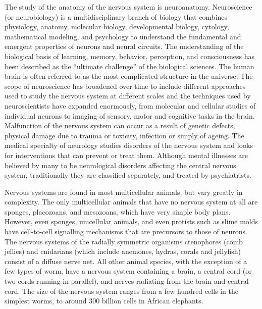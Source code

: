 \documentclass[]{book}
\begin{document}
The study of the anatomy of the nervous system is neuroanatomy. Neuroscience (or neurobiology) is a multidisciplinary branch of biology that combines physiology, anatomy, molecular biology, developmental biology, cytology, mathematical modeling, and psychology to understand the fundamental and emergent properties of neurons and neural circuits. The understanding of the biological basis of learning, memory, behavior, perception, and consciousness has been described as the ``ultimate challenge'' of the biological sciences. The human brain is often referred to as the most complicated structure in the universe. The scope of neuroscience has broadened over time to include different approaches used to study the nervous system at different scales and the techniques used by neuroscientists have expanded enormously, from molecular and cellular studies of individual neurons to imaging of sensory, motor and cognitive tasks in the brain. Malfunction of the nervous system can occur as a result of genetic defects, physical damage due to trauma or toxicity, infection or simply of ageing. The medical specialty of neurology studies disorders of the nervous system and looks for interventions that can prevent or treat them. Although mental illnesses are believed by many to be neurological disorders affecting the central nervous system, traditionally they are classified separately, and treated by psychiatrists.

Nervous systems are found in most multicellular animals, but vary greatly in complexity. The only multicellular animals that have no nervous system at all are sponges, placozoans, and mesozoans, which have very simple body plans. However, even sponges, unicellular animals, and even protists such as slime molds have cell-to-cell signalling mechanisms that are precursors to those of neurons. The nervous systems of the radially symmetric organisms ctenophores (comb jellies) and cnidarians (which include anemones, hydras, corals and jellyfish) consist of a diffuse nerve net. All other animal species, with the exception of a few types of worm, have a nervous system containing a brain, a central cord (or two cords running in parallel), and nerves radiating from the brain and central cord. The size of the nervous system ranges from a few hundred cells in the simplest worms, to around 300 billion cells in African elephants.
\end{document}
